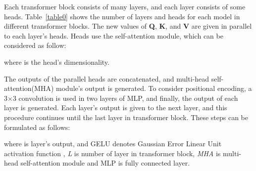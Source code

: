 \documentclass{article}
\begin{document}
Each transformer block consists of many layers, and each layer consists of some heads. Table~\ref{table0} shows the number of layers and heads for each model in different transformer blocks. The new values of  \textbf{Q}, \textbf{K}, and \textbf{V} are given in parallel to each layer's heads. Heads use the self-attention module, which can be considered as follow:

where  is the head's dimensionality.

The outputs of the parallel heads are concatenated, and multi-head self-attention(MHA) module's output is generated. To consider positional encoding, a 3×3 convolution is used in two layers of MLP, and finally, the output of each layer is generated. Each layer's output is given to the next layer, and this procedure continues until the last layer in transformer block. These steps can be formulated as follows:

where  is layer's output, and GELU denotes Gaussian Error Linear Unit activation function \cite{hendrycks2016gaussian}, \textit{L} is number of layer in transformer block, \textit{MHA} is  multi-head self-attention module and MLP is fully connected layer.
\end{document}
